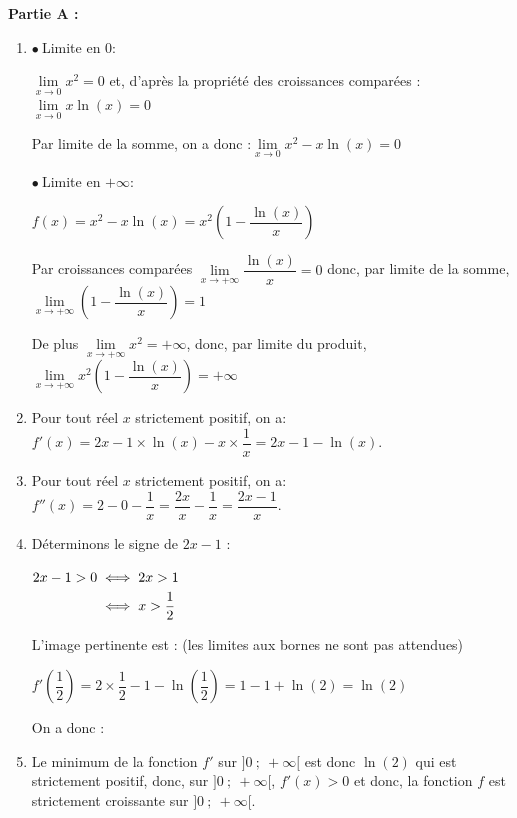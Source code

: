 
\medskip

\textbf{Partie A :}

\medskip

\begin{enumerate}
	\item $\bullet~$Limite en 0:

$\lim\limits_{x\to 0} x^2 =0$ et, d'après la propriété des croissances comparées : \quad $\lim\limits_{x\to 0}x\ln(x)=0$

Par limite de la somme,  on a donc :\quad $\lim\limits_{x\to 0} x^2-x\ln(x)=0$

$\bullet~$Limite en $+\infty$:

$f(x)=x^2-x\ln(x)=x^2 \left(1-\dfrac{\ln(x)}{x}\right)$

	Par croissances comparées $\lim\limits_{x\to +\infty}\dfrac{\ln(x)}{x}=0$ donc, par limite de la somme, $\lim\limits_{x\to +\infty}\left( 1- \dfrac{\ln(x)}{x}\right)=1$

	De plus $\lim\limits_{x\to +\infty} x^2 =+\infty$, donc, par limite du produit,  $\lim\limits_{x\to +\infty } x^2 \left(1-\dfrac{\ln(x)}{x}\right)=+\infty$

	\item  Pour tout réel $x$ strictement positif, on a: $f'(x) =2x -1 \times \ln(x) -x \times \dfrac{1}{x}= 2x -1 -\ln(x)$.

	\item  Pour tout réel $x$ strictement positif, on a: $f''(x) =2- 0 - \dfrac{1}{x}= \dfrac{2x}{x} -\dfrac{1}{x}= \dfrac{2x-1}{x}$.

	\item  	Déterminons le signe de $2x-1$ :

	$\aligned[t] 2x-1 >0 &\iff 2x > 1 \\
	&\iff x>\dfrac{1}{2}\endaligned$

	L'image pertinente est : (les limites aux bornes ne sont pas attendues)


	$f'\left( \dfrac{1}{2}\right)= 2 \times \dfrac{1}{2}-1-\ln\left(\dfrac{1}{2} \right)= 1-1+\ln(2)=\ln(2)$

	On a donc :


	\item Le minimum  de la fonction $f'$ sur $]0~;~+\infty[$  est donc $\ln(2)$ qui est strictement positif,  donc, sur $]0~;~+\infty[$, $f'(x)>0$ et donc, la fonction $f$ est strictement croissante sur   $]0~;~+\infty[$.
\end{enumerate}


